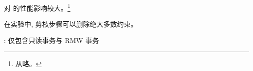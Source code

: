 \begin{frame}{}
	\begin{center}
		 对 \polysi{} 的性能影响较大。\footnote{
			 从略。
		}

		\vspace{0.30cm}
	\end{center}
\end{frame}

\begin{frame}{}
	\begin{center}
		在实验中, 剪枝步骤可以删除绝大多数约束。

		\vspace{0.30cm}
		
		\vspace{0.30cm}

		: 仅包含只读事务与 RMW 事务
	\end{center}
\end{frame}
